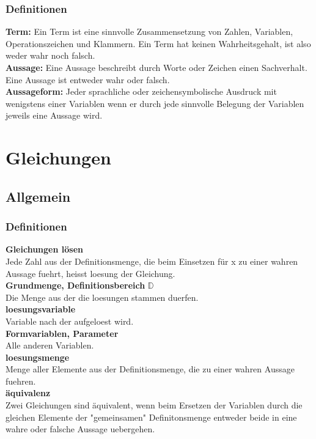 \begin{multicols}{2}
    \subsubsection{Definitionen}
    \vspace{-4mm}
    \textbf{Term:}  Ein Term ist eine sinnvolle Zusammensetzung von Zahlen,
    Variablen, Operationszeichen und Klammern.
    Ein Term hat keinen Wahrheitsgehalt, ist also weder wahr noch falsch. \\
    \textbf{Aussage:}
    Eine Aussage beschreibt durch Worte oder Zeichen einen Sachverhalt.
    Eine Aussage ist entweder wahr oder falsch. \\
    \textbf{Aussageform:}
    Jeder sprachliche oder zeichensymbolische Ausdruck mit wenigstens einer Variablen
    wenn er durch jede sinnvolle Belegung der Variablen jeweils eine Aussage wird.


    \section{Gleichungen}
    \vspace{-4mm}
    \subsection{Allgemein}
    \vspace{-4mm}
    \subsubsection{Definitionen}
    \vspace{-4mm}
    \textbf{Gleichungen lösen} \\
    Jede Zahl aus der Definitionsmenge, die beim Einsetzen für x zu einer wahren Aussage fuehrt, heisst loesung der Gleichung. \\
    \textbf{Grundmenge, Definitionsbereich} $\mathbb{D}$ \\
    Die Menge aus der die loesungen stammen duerfen. \\
    \textbf{loesungsvariable} \\
    Variable nach der aufgeloest wird. \\
    \textbf{Formvariablen, Parameter} \\
    Alle anderen Variablen. \\
    \textbf{loesungsmenge} \\
    Menge aller Elemente aus der Definitionsmenge, die zu einer wahren Aussage fuehren. \\
    \textbf{äquivalenz} \\
    Zwei Gleichungen sind äquivalent, wenn beim Ersetzen der Variablen durch die gleichen Elemente der "gemeinsamen" Definitonsmenge entweder beide in eine wahre oder falsche Aussage uebergehen.


\end{multicols}
